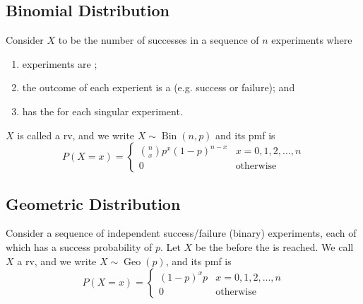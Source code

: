 \documentclass[notoc,notitlepage]{tufte-book}
\DeclareMathOperator{\Bin}{Bin }
\DeclareMathOperator{\Geo}{Geo }
\begin{document}
\subsection{Binomial Distribution}
\label{sub:binomial_distribution}

\begin{defn}[Binomial RV]\label{defn:binomial_rv}
  Consider $X$ to be the number of successes in a sequence of $n$ experiments where
  \begin{enumerate}
    \item experiments are ;
    \item the outcome of each experient is a  (e.g. success or failure); and
    \item has the  for each singular experiment.
  \end{enumerate}
  $X$ is called a  rv, and we write $X \sim \Bin(n, p)$ and its pmf is
  \begin{equation*}
    P(X = x) = \begin{cases} 
      \binom{n}{x} p^x (1 - p)^{n - x} & x = 0, 1, 2, ..., n \\
      0                                & \text{otherwise}
    \end{cases}
  \end{equation*}
\end{defn}


\subsection{Geometric Distribution}
\label{sub:geometric_distribution}

\begin{defn}[Geometric RV]\label{defn:geometric_rv}
  Consider a sequence of independent success/failure (binary) experiments, each of which has a success probability of $p$. Let $X$ be the  before the  is reached. We call $X$ a  rv, and we write $X \sim \Geo(p)$, and its pmf is
  \begin{equation*}
    P(X = x) = \begin{cases} 
      (1 - p)^x p & x = 0, 1, 2, ..., n \\
      0           & \text{otherwise}
    \end{cases}
  \end{equation*}
\end{defn}
\end{document}
